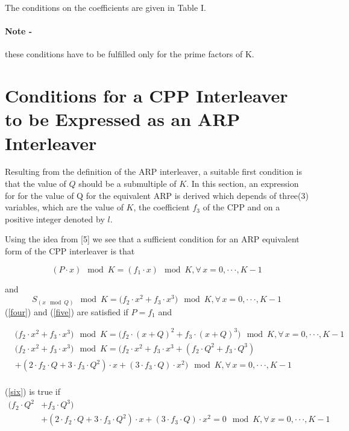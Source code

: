 \documentclass[fontsize=12pt]{article}
\begin{document}
 
 The conditions on the coefficients are given in Table I.
\paragraph{Note - } these conditions have to be fulfilled only for
the prime factors of K.

\section{Conditions for a CPP Interleaver to be  Expressed as an ARP Interleaver}
Resulting from the definition of the ARP interleaver, a suitable first condition is that the value of $Q$ should be a submultiple of $K$. In this section, an expression for for the value of Q for the equivalent ARP is derived which depends of three(3) variables, which are the value of $K$, the coefficient $f_3$ of the CPP and on a positive integer denoted by $l$.

Using the idea from [5] we see that a sufficient condition for an ARP equivalent form of the CPP interleaver is that

\begin{equation}
(P\cdot x) \mod K =(f_1\cdot x) \mod K, \forall \,x= 0,\cdot\cdot\cdot,K-1
\label{four}
\end{equation}

and 
\begin{equation}
 S_{(x \mod Q)}\mod K = \Big(f_2\cdot x^2 +f_3 \cdot x^3\Big) \mod K,\forall \,x= 0,\cdot\cdot\cdot,K-1
 \label{five}
\end{equation}
(\ref{four}) and (\ref{five}) are satisfied if $P=f_1$ and

\begin{equation}
\begin{split}
&\Big(f_2\cdot x^2 +f_3 \cdot x^3\Big) \mod K = \Big(f_2\cdot (x+Q)^2 +f_3 \cdot (x+Q)^3\Big) \mod K ,\forall \,x= 0,\cdot\cdot\cdot,K-1\\
&\Big(f_2\cdot x^2 +f_3 \cdot x^3\Big) \mod K = \Big(f_2\cdot x^2 +f_3 \cdot x^3 + (f_2\cdot Q^2 +f_3 \cdot Q^3)\\
&+(2\cdot f_2 \cdot Q +3\cdot f_3 \cdot Q^2)\cdot x + (3\cdot f_3 \cdot Q)\cdot x^2 \Big) \mod K ,\forall \,x= 0,\cdot\cdot\cdot,K-1\\
\label{six}
\end{split}
\end{equation}

(\ref{six}) is true if 
\begin{equation}
\begin{split}
  (f_2\cdot Q^2 &+f_3 \cdot Q^3)\\
&+(2\cdot f_2 \cdot Q +3\cdot f_3 \cdot Q^2)\cdot x + (3\cdot f_3 \cdot Q)\cdot x^2 = 0 \mod K ,\forall \,x= 0,\cdot\cdot\cdot,K-1\\
\label{seven}
\end{split}
\end{equation}
\end{document}
